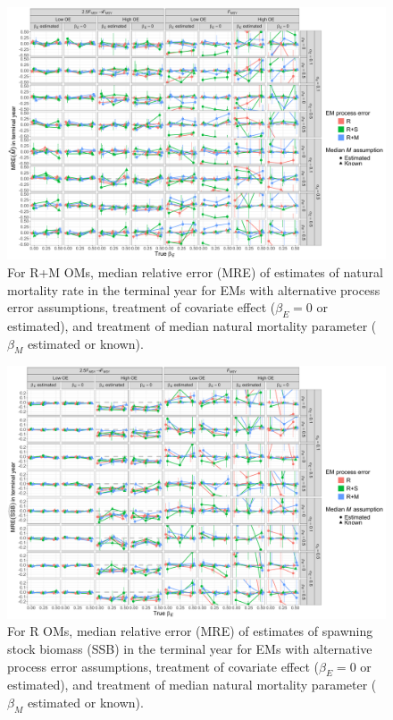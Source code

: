 \documentclass[
  12pt,
]{article}
\begin{document}
\begin{landscape}
\begin{figure}
\begin{center}
\includegraphics[height = \textheight]{terminal_year_M_bias_RMom}
\end{center}
\caption{For R+M OMs, median relative error (MRE) of estimates of natural mortality rate in the terminal year for EMs with alternative process error assumptions, treatment of covariate effect ($\beta_E = 0$ or estimated), and treatment of median natural mortality parameter ($\beta_M$ estimated or known).}\label{terminal_M_bias_RMom}
\end{figure}
\end{landscape}

\begin{landscape}
\begin{figure}
\begin{center}
\includegraphics[height = \textheight]{terminal_year_ssb_bias_Rom}
\end{center}
\caption{For R OMs, median relative error (MRE) of estimates of spawning stock biomass (SSB) in the terminal year for EMs with alternative process error assumptions, treatment of covariate effect ($\beta_E = 0$ or estimated), and treatment of median natural mortality parameter ($\beta_M$ estimated or known).}\label{terminal_ssb_bias_Rom}
\end{figure}
\end{landscape}
\end{document}
